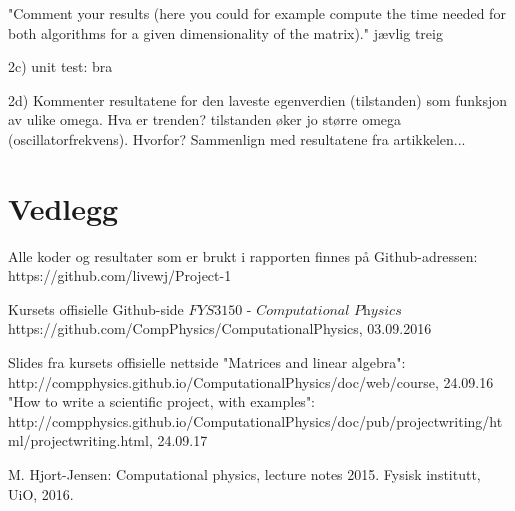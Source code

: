 \documentclass{article}
\begin{document}
 "Comment your results (here you could for example compute the time needed for both algorithms for a given dimensionality of the matrix)."
 jævlig treig
 
 2c) unit test: bra
 
 2d) Kommenter resultatene for den laveste egenverdien (tilstanden) som funksjon av ulike omega. Hva er trenden? tilstanden øker jo større omega (oscillatorfrekvens). Hvorfor? 
 Sammenlign med resultatene fra artikkelen...
 

\section{Vedlegg}
Alle koder og resultater som er brukt i rapporten finnes på Github-adressen: https://github.com/livewj/Project-1




\begin{thebibliography}{9}

  Kursets offisielle Github-side $\textit{FYS3150 - Computational Physics}$
  https://github.com/CompPhysics/ComputationalPhysics,
  03.09.2016  
  
\bibitem{}
  Slides fra kursets offisielle nettside
  "Matrices and linear algebra":
   http://compphysics.github.io/ComputationalPhysics/doc/web/course, 24.09.16
  "How to write a scientific project, with examples":
  http://compphysics.github.io/ComputationalPhysics/doc/pub/projectwriting/html/projectwriting.html, 24.09.17
   
\bibitem{}
   M. Hjort-Jensen: Computational physics, lecture notes 2015. Fysisk institutt, UiO, 2016.

   
\end{thebibliography}
\end{document}
